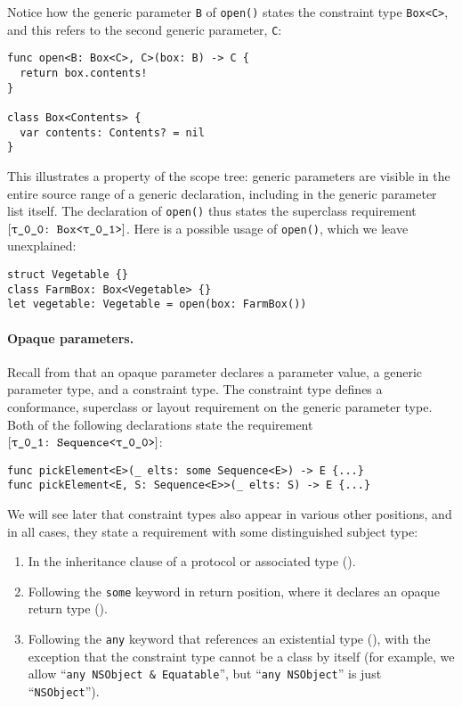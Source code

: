 \documentclass[../generics]{subfiles}
\begin{document}
\begin{example}
Notice how the generic parameter \texttt{B} of \texttt{open()} states the constraint type \texttt{Box<C>}, and this refers to the second generic parameter, \texttt{C}:
\begin{Verbatim}
func open<B: Box<C>, C>(box: B) -> C {
  return box.contents!
}

class Box<Contents> {
  var contents: Contents? = nil
}
\end{Verbatim}
This illustrates a property of the scope tree: generic parameters are visible in the entire source range of a generic declaration, including in the generic parameter list itself.
The declaration of \texttt{open()} thus states the superclass requirement $[\texttt{\texttt{$\uptau$\_0\_0}:~Box<\texttt{$\uptau$\_0\_1}>}]$. Here is a possible usage of \texttt{open()}, which we leave unexplained:
\begin{Verbatim}
struct Vegetable {}
class FarmBox: Box<Vegetable> {}
let vegetable: Vegetable = open(box: FarmBox())
\end{Verbatim}
\end{example}

\paragraph{Opaque parameters.}
Recall from  that an opaque parameter declares a parameter value, a generic parameter type, and a constraint type. The constraint type defines a conformance, superclass or layout requirement on the generic parameter type. Both of the following declarations state the requirement $[\texttt{\texttt{$\uptau$\_0\_1}:~Sequence<\texttt{$\uptau$\_0\_0}>}]$:
\begin{Verbatim}
func pickElement<E>(_ elts: some Sequence<E>) -> E {...}
func pickElement<E, S: Sequence<E>>(_ elts: S) -> E {...}
\end{Verbatim}

We will see later that constraint types also appear in various other positions, and in all cases, they state a requirement with some distinguished subject type:
\begin{enumerate}
\item In the inheritance clause of a protocol or associated type ().
\item Following the \texttt{some} keyword in return position, where it declares an opaque return type ().
\item Following the \texttt{any} keyword that references an existential type (), with the exception that the constraint type cannot be a class by itself (for example, we allow ``\verb|any NSObject & Equatable|'', but ``\verb|any NSObject|'' is just ``\texttt{NSObject}'').
\end{enumerate}
\end{document}
